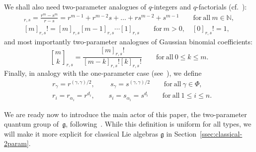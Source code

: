 \documentclass[10pt,a4paper]{amsart}
\numberwithin{equation}{section}
\newcommand{\qbinom}{\genfrac{[}{]}{0pt}{}}
\newcommand{\fg}{\mathfrak{g}}
\newcommand{\BN}{\mathbb{N}}
\begin{document}
We shall also need two-parameter analogues of $q$-integers and $q$-factorials (cf.\ \cite[equation~(2.2)]{BW2}):
\begin{gather*}%
 [m]_{r,s} = \frac{r^{m} - s^{m}}{r - s} = r^{m-1} + r^{m-2}s + \dots + rs^{m-2} + s^{m-1}
 \qquad \mathrm{for\ all} \ m\in \BN,
\\ %
 [m]_{r,s}! = [m]_{r,s}[m-1]_{r,s} \cdots [1]_{r,s} \qquad \mathrm{for} \ m > 0,
 \quad [0]_{r,s}!=1,
\end{gather*}
and most importantly two-parameter analogues of Gaussian binomial coefficients:
\begin{displaymath}
 \qbinom{m}{k}_{r,s} = \frac{[m]_{r,s}!}{[m - k]_{r,s}![k]_{r,s}!}
 \qquad \mathrm{for\ all} \ 0\leq k\leq m.
\end{displaymath}
Finally, in analogy with the one-parameter case (see~\cite[Section~4.2]{J}), we define
\begin{align}
 & r_{\gamma} = r^{(\gamma,\gamma)/2},\ \qquad s_{\gamma} = s^{(\gamma,\gamma)/2}
 \qquad \mathrm{for\ all} \ \gamma\in \Phi, \nonumber\\
 & r_{i} = r_{\alpha_i} = r^{d_{i}},\qquad s_{i} = s_{\alpha_i} = s^{d_{i}}
 \qquad \mathrm{for\ all} \ 1\leq i\leq n.\label{eq:rs_i}
\end{align}

We are ready now to introduce the main actor of this paper, the two-parameter quantum group of~$\fg$, following~\cite{HP}. While this definition is uniform for all types, we will make it more explicit for classical Lie algebras $\fg$ in Section~\ref{ssec:classical-2param}.
\end{document}
